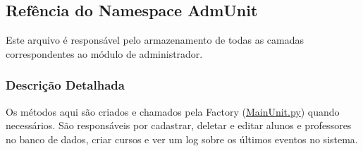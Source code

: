 \hypertarget{namespaceAdmUnit}{\subsection{Refência do Namespace Adm\-Unit}
\label{namespaceAdmUnit}
}


Este arquivo é responsável pelo armazenamento de todas as camadas correspondentes ao módulo de administrador.  




\subsubsection{Descrição Detalhada}
Os métodos aqui são criados e chamados pela Factory (\hyperlink{MainUnit_8py}{Main\-Unit.\-py}) quando necessários. São responsáveis por cadastrar, deletar e editar alunos e professores no banco de dados, criar cursos e ver um log sobre os últimos eventos no sistema. 
